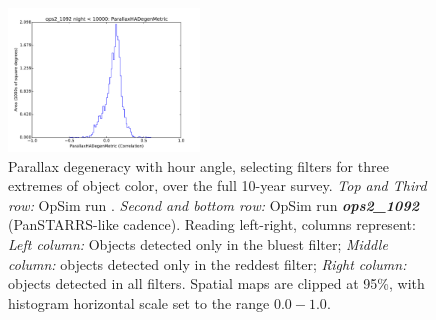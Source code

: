 \begin{figure}[ht]
\begin{center}
  \includegraphics[width=2.0in]{./figs/milkyway/MW_Astrom_paDegen_1092_10y_hst.pdf}
  \end{center}
  \caption{Parallax degeneracy with hour angle, selecting filters for three extremes of object color, over the full 10-year survey. {\it Top and Third row:} OpSim run . {\it Second and bottom row:} OpSim run {\it \bf ops2\_1092} (PanSTARRS-like cadence). Reading left-right, columns represent: {\it Left column:} Objects detected only in the bluest filter; {\it Middle column:} objects detected only in the reddest filter; {\it Right column:} objects detected in all filters. Spatial maps are clipped at 95\%, with histogram horizontal scale set to the range $0.0-1.0$.}
  \label{fig_astrom_ByFilter_PADegen}
\end{figure}

